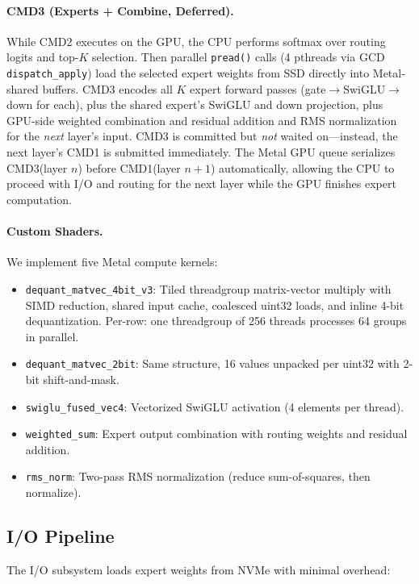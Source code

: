 \documentclass[11pt,twocolumn]{article}
\begin{document}
\paragraph{CMD3 (Experts + Combine, Deferred).}
While CMD2 executes on the GPU, the CPU performs softmax over routing logits and top-$K$ selection.
Then parallel \texttt{pread()} calls (4 pthreads via GCD \texttt{dispatch\_apply}) load the selected expert weights from SSD directly into Metal-shared buffers.
CMD3 encodes all $K$ expert forward passes (gate$\to$SwiGLU$\to$down for each), plus the shared expert's SwiGLU and down projection, plus GPU-side weighted combination and residual addition and RMS normalization for the \emph{next} layer's input.
CMD3 is committed but \emph{not} waited on---instead, the next layer's CMD1 is submitted immediately.
The Metal GPU queue serializes CMD3(layer $n$) before CMD1(layer $n+1$) automatically, allowing the CPU to proceed with I/O and routing for the next layer while the GPU finishes expert computation.

\paragraph{Custom Shaders.}
We implement five Metal compute kernels:
\begin{itemize}[leftmargin=*,itemsep=1pt]
    \item \texttt{dequant\_matvec\_4bit\_v3}: Tiled threadgroup matrix-vector multiply with SIMD reduction, shared input cache, coalesced uint32 loads, and inline 4-bit dequantization.
    Per-row: one threadgroup of 256 threads processes 64 groups in parallel.
    \item \texttt{dequant\_matvec\_2bit}: Same structure, 16 values unpacked per uint32 with 2-bit shift-and-mask.
    \item \texttt{swiglu\_fused\_vec4}: Vectorized SwiGLU activation (4 elements per thread).
    \item \texttt{weighted\_sum}: Expert output combination with routing weights and residual addition.
    \item \texttt{rms\_norm}: Two-pass RMS normalization (reduce sum-of-squares, then normalize).
\end{itemize}

\subsection{I/O Pipeline}
\label{sec:io}

The I/O subsystem loads expert weights from NVMe with minimal overhead:
\end{document}
